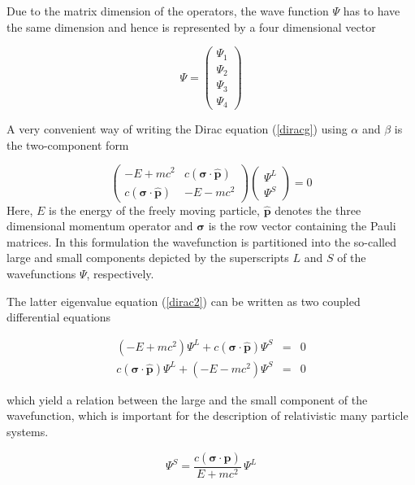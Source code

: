 Due to the matrix dimension of the operators, the wave function $\Psi$ has to have
the same dimension and hence is represented by a four dimensional vector

\begin{equation}
\Psi = \begin{pmatrix}
\Psi_1\\\Psi_2\\\Psi_3\\\Psi_4
\end{pmatrix}
\end{equation}

A very convenient way of writing the Dirac equation (\ref{diracg})
using $\alpha$ and $\beta$
is the two-component form

\begin{equation}\label{dirac2}
\left(\begin{array}{cc}
-E +mc^2 & c(\mathbf{\sigma}\cdot\hat{\mathbf{p}})\\
c(\mathbf{\sigma}\cdot\hat{\mathbf{p}}) & -E-mc^2
\end{array}\right)
\begin{pmatrix}\Psi^L\\\Psi^S\end{pmatrix}
=0
\end{equation}
Here, $E$ is the energy of the freely moving particle, $\hat{\mathbf{p}}$ denotes
the three dimensional momentum operator and $\mathbf{\sigma}$ is the row vector
containing the Pauli matrices. In this formulation the wavefunction is partitioned
into the so-called large and small components depicted by the superscripts $L$ and
$S$ of the wavefunctions $\Psi$, respectively.

The latter eigenvalue equation (\ref{dirac2}) can be written as two coupled
differential equations

\begin{equation}\begin{array}{rcl}
(-E+mc^2)\Psi^L + c(\mathbf{\sigma}\cdot\hat{\mathbf{p}}) \Psi^S &=& 0\\
c(\mathbf{\sigma}\cdot\hat{\mathbf{p}}) \Psi^L +(-E-mc^2)\Psi^S &=& 0
\end{array}\end{equation}

which yield a relation between the large and the small component of the
wavefunction, which is important for the description of relativistic
many particle systems.

\begin{equation}\label{zusklgr}
\Psi^S = \frac{c(\mathbf{\sigma}\cdot\hat{\mathbf{p}})}{E+mc^2}\,\Psi^L
\end{equation}

